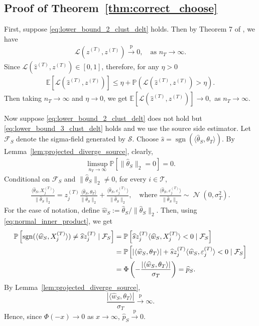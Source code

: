 \documentclass[10pt]{article}
\newcommand{\Pbb}{\mathbb P}
\newcommand{\convp}{\xrightarrow{\mathrm{p}}}
\newcommand{\wh}{\widehat}
\newcommand{\calL}{\mathcal L}
\DeclareMathOperator{\dnorm}{\mathcal N}
\newcommand{\calT}{\mathcal T}
\newcommand{\trg}{T}
\newcommand{\thetaT}{\theta_{\trg}}
\newcommand{\nT}{n_{\trg}}
\newcommand{\sigmaT}{\sigma_{\trg}}
\newcommand{\Xtar}{X^{(\trg)}}
\newcommand{\ztar}{z^{(\trg)}}
\newcommand{\hatztar}{\wh{z}^{(\trg)}}
\newcommand{\calS}{\mathcal S}
\newcommand{\src}{S}
\begin{document}
\subsection{Proof of Theorem~\ref{thm:correct_choose}}
First, suppose \eqref{eq:lower_bound_2_clust_delt} holds. Then by Theorem 7 of \cite{Ndaoud2022}, we have
\begin{align}
    \calL\left(\hatztar,\ztar\right) \convp 0, \quad \mbox{as $\nT \to \infty$.}
\end{align}
Since $\calL\left(\hatztar,\ztar\right) \in [0,1]$, therefore, for any $\eta>0$
\begin{align}
\label{eq:bound_expectation_expect}
    \mathbb E\left[\calL\left(\hatztar,\ztar\right)\right] \le \eta + \mathbb P\left(\calL\left(\hatztar,\ztar\right)>\eta\right).
\end{align}
Then taking $\nT \to \infty$ and $\eta \to 0$, we get $\mathbb E\left[\calL\left(\hatztar,\ztar\right)\right] \to 0,$ as $\nT \to \infty$.

Now suppose \eqref{eq:lower_bound_2_clust_delt} does not hold but \eqref{eq:lower_bound_3_clust_delt} holds and we use the source side estimator.
Let $\mathcal F_\src$ denote the sigma-field generated by $\calS$. Choose $\wh s=\operatorname{sgn}(\langle\wh \theta_\src,\theta_\trg\rangle).$ By Lemma~\ref{lem:projected_diverge_source}, clearly,
\begin{align}
\label{eq:no_zero_source}
\limsup_{\nT 
\to \infty}\Pbb\left[\|\wh \theta_\src\|_2=0\right] = 0.
\end{align}
Conditional on $\mathcal F_\src$ and $\|\wh \theta_\src\|_2\neq 0$, for every $i\in \calT$,
\begin{align}
\label{eq:normal_inner_product}
\frac{\langle\wh\theta_\src, \Xtar_j\rangle}{\|\wh\theta_\src\|_2}=\ztar_j \frac{\langle\wh \theta_\src,\theta_\trg\rangle}{{\|\wh\theta_\src\|_2}}+\frac{\langle\wh\theta_\src,\varepsilon_j^{(\trg)}\rangle}{{\|\wh\theta_\src\|_2}},\quad \mbox{where}\; \frac{\langle\wh\theta_\src,\varepsilon_j^{(\trg)}\rangle}{\|\wh\theta_\src\|_2}\sim \dnorm(0,\sigmaT^2).
\end{align}
For the ease of notation, define $\wh w_\src:=\wh\theta_\src/\|\wh\theta_\src\|_2$. Then, using \eqref{eq:normal_inner_product}, we get
\begin{align}
\mathbb P\left[\operatorname{sgn}(\langle\wh w_\src, \Xtar_j\rangle)\ne \wh s \ztar_j\mid \mathcal F_\src\right]
&=\mathbb P\left[\wh s \ztar_j\langle\wh w_\src, \Xtar_j\rangle<0\mid \mathcal F_\src\right] \notag \\
&=\mathbb P\left[|\langle\wh w_\src, \thetaT\rangle|+\wh s \ztar_j\langle\wh w_\src, \varepsilon_j^{(\trg)}\rangle<0\mid \mathcal F_\src\right] \notag \\
&=\Phi\left(-\frac{|\langle\wh w_\src, \thetaT\rangle|}{\sigmaT}\right)=\wh p_\src.
\end{align}
By Lemma~\ref{lem:projected_diverge_source},
\[
\frac{|\langle\wh w_\src,\thetaT\rangle|}{\sigmaT}\convp\infty.
\]
Hence, since $\Phi(-x)\to0$ as $x\to\infty$, $\wh p_\src \convp 0$.
\end{document}
